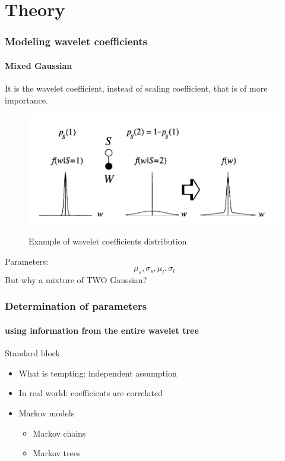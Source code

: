 \documentclass[12pt]{beamer}
\begin{document}
\section{Theory}
\begin{frame}
  \frametitle{Modeling wavelet coefficients}
  \framesubtitle{Mixed Gaussian}
  
  It is the wavelet coefficient, instead of scaling coefficient, that is of more
  importance.
  \begin{figure}[H]
  \centering
  \includegraphics[scale=0.5]{../figs/theory/mixed_gaussian}
  \label{fig:hist_wavelet_coefs}
  \caption{Example of wavelet coefficients distribution}
  \end{figure}
  Parameters:
  $$
    \mu_s, \sigma_s, \mu_l, \sigma_l
  $$
  But why a mixture of TWO Gaussian?
\end{frame}

\begin{frame}
  \frametitle{Determination of parameters}
  \framesubtitle{using information from the entire wavelet tree}
  \begin{block}{Standard block}
  \begin{itemize}
    \item What is tempting: independent assumption
    \item In real world: coefficients are correlated
    \item Markov models
    \begin{itemize}
      \item Markov chains
      \item Markov trees
    \end{itemize}
  \end{itemize}
  \end{block}   
\end{frame}
\end{document}
